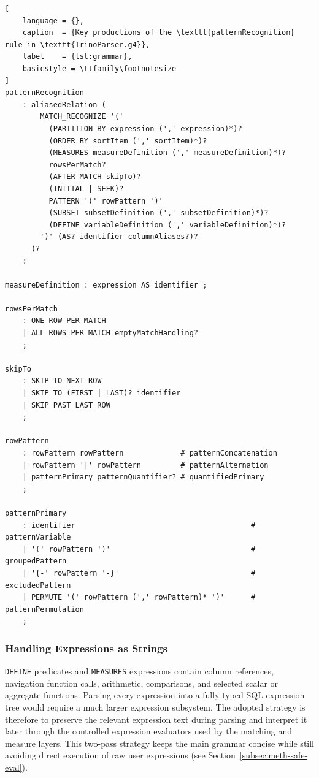 \begin{lstlisting}[
    language = {},
    caption  = {Key productions of the \texttt{patternRecognition} rule in \texttt{TrinoParser.g4}},
    label    = {lst:grammar},
    basicstyle = \ttfamily\footnotesize
]
patternRecognition
    : aliasedRelation (
        MATCH_RECOGNIZE '('
          (PARTITION BY expression (',' expression)*)?
          (ORDER BY sortItem (',' sortItem)*)?
          (MEASURES measureDefinition (',' measureDefinition)*)?
          rowsPerMatch?
          (AFTER MATCH skipTo)?
          (INITIAL | SEEK)?
          PATTERN '(' rowPattern ')'
          (SUBSET subsetDefinition (',' subsetDefinition)*)?
          (DEFINE variableDefinition (',' variableDefinition)*)?
        ')' (AS? identifier columnAliases?)?
      )?
    ;

measureDefinition : expression AS identifier ;

rowsPerMatch
    : ONE ROW PER MATCH
    | ALL ROWS PER MATCH emptyMatchHandling?
    ;

skipTo
    : SKIP TO NEXT ROW
    | SKIP TO (FIRST | LAST)? identifier
    | SKIP PAST LAST ROW
    ;

rowPattern
    : rowPattern rowPattern             # patternConcatenation
    | rowPattern '|' rowPattern         # patternAlternation
    | patternPrimary patternQuantifier? # quantifiedPrimary
    ;

patternPrimary
    : identifier                                        # patternVariable
    | '(' rowPattern ')'                                # groupedPattern
    | '{-' rowPattern '-}'                              # excludedPattern
    | PERMUTE '(' rowPattern (',' rowPattern)* ')'      # patternPermutation
    ;
\end{lstlisting}

\subsubsection{Handling Expressions as Strings}
\label{subsubsec:meth-expr-strings}

\texttt{DEFINE} predicates and \texttt{MEASURES} expressions contain
column references, navigation function calls, arithmetic, comparisons,
and selected scalar or aggregate functions.  Parsing every expression
into a fully typed SQL expression tree would require a much larger
expression subsystem.  The adopted strategy is therefore to preserve
the relevant expression text during parsing and interpret it later
through the controlled expression evaluators used by the matching and
measure layers.  This two-pass strategy keeps the main grammar concise
while still avoiding direct execution of raw user expressions (see
Section~\ref{subsec:meth-safe-eval}).

